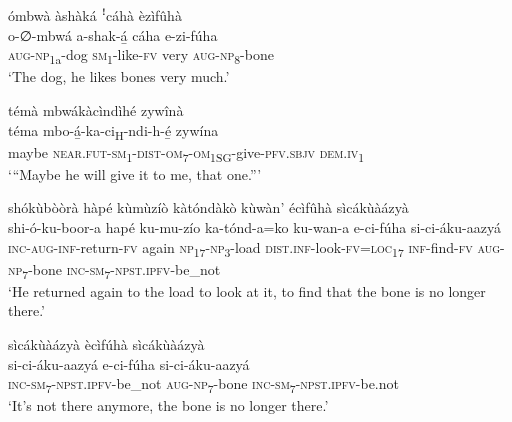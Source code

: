 ómbwà àshàká ꜝcáhà èzìfûhà \\
\gll o-∅-mbwá    a-shak-á̲  cáha  e-zi-fúha\\
\textsc{aug}{}-\textsc{np}\textsubscript{1a}{}-dog  \textsc{sm}\textsubscript{1}{}-like-\textsc{fv}  very  \textsc{aug}{}-\textsc{np}\textsubscript{8}{}-bone\\
\glt ‘The dog, he likes bones very much.’\bigskip

témà mbwákàcìndìhé zywînà \\
\gll téma    mbo-á̲-ka-ci\textsubscript{H}{}-ndi-h-é̲        zywína\\
maybe    \textsc{near}.\textsc{fut}{}-\textsc{sm}\textsubscript{1}{}-\textsc{dist}{}-\textsc{om}\textsubscript{7}{}-\textsc{om}\textsubscript{1SG}{}-give-\textsc{pfv}.\textsc{sbjv}  \textsc{dem}.\textsc{iv}\textsubscript{1}\\
\glt ‘“Maybe he will give it to me, that one.”’\bigskip

\newpage
shókùbòòrà hàpé kùmùzíò kàtóndàkò kùwàn’ écìfûhà sìcákùàázyà\\
\gll shi-ó-ku-boor-a    hapé  ku-mu-zío    ka-tónd-a=ko ku-wan-a  e-ci-fúha    si-ci-áku-aazyá\\
\textsc{inc}{}-\textsc{aug}{}-\textsc{inf}{}-return-\textsc{fv}  again  \textsc{np}\textsubscript{17}{}-\textsc{np}\textsubscript{3}{}-load    \textsc{dist}.\textsc{inf}{}-look-\textsc{fv}=\textsc{loc}\textsubscript{17}
\textsc{inf}{}-find-\textsc{fv}  \textsc{aug}{}-\textsc{np}\textsubscript{7}{}-bone  \textsc{inc}{}-\textsc{sm}\textsubscript{7}{}-\textsc{npst}.\textsc{ipfv}{}-be\_not\\
\glt ‘He returned again to the load to look at it, to find that the bone is no longer there.’\bigskip

sìcákùàázyà ècìfúhà sìcákùàázyà\\
\gll si-ci-áku-aazyá      e-ci-fúha    si-ci-áku-aazyá\\
\textsc{inc}{}-\textsc{sm}\textsubscript{7}{}-\textsc{npst}.\textsc{ipfv}{}-be\_not    \textsc{aug}{}-\textsc{np}\textsubscript{7}{}-bone  \textsc{inc}{}-\textsc{sm}\textsubscript{7}{}-\textsc{npst}.\textsc{ipfv}{}-be.not\\
\glt ‘It’s not there anymore, the bone is no longer there.’\bigskip

